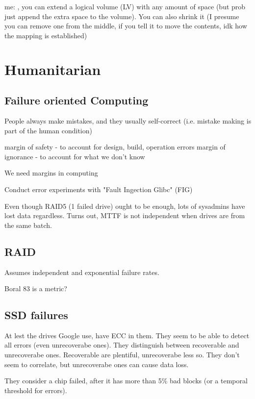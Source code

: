\documentclass[a4paper]{report}
\begin{document}
        me: , you can extend a logical volume (LV) with any amount of space (but
        prob just append the extra space to the volume). You can also shrink it (I
        presume you can remove one from the middle, if you tell it to move the
        contents, idk how the mapping is established)


\section{Humanitarian}
    \subsection{Failure oriented Computing}

        People always make mistakes, and they usually self-correct (i.e.
        mistake making is part of the human condition)

        margin of safety - to account for design, build, operation errors
        margin of ignorance - to account for what we don't know

        We need margins in computing

        Conduct error experiments with "Fault Ingection Glibc" (FIG)

        Even though RAID5 (1 failed drive) ought to be enough, lots of
        sysadmins have lost data regardless. Turns out, MTTF is not independent
        when drives are from the same batch.

    \subsection{RAID}
        Assumes independent and exponential failure rates.

        Boral 83 is a metric?

    \subsection{SSD failures}

        At lest the drives Google use, have ECC in them. They seem to be able
        to detect all errors (even unrecoverabe ones). They distinguish between
        recoverable and unrecoverabe ones. Recoverable are plentiful,
        unrecoverabe less so. They don't seem to correlate, but unrecoverabe
        ones can cause data loss.

        They consider a chip failed, after it has more than 5\% bad blocks (or
        a temporal threshold for errors).
\end{document}

